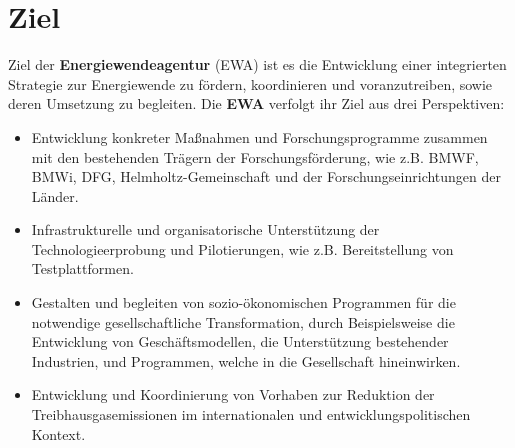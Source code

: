 \section{Ziel}

Ziel der \textbf{Energiewendeagentur} (EWA) ist es die Entwicklung einer integrierten Strategie zur Energiewende zu fördern, koordinieren und voranzutreiben, sowie deren Umsetzung zu begleiten.
%
Die \textbf{EWA} verfolgt ihr Ziel aus drei Perspektiven:
\begin{itemize}
	\item Entwicklung konkreter Maßnahmen und Forschungsprogramme zusammen mit den bestehenden Trägern der Forschungsförderung, wie z.B. BMWF, BMWi, DFG, Helmholtz-Gemeinschaft und der Forschungseinrichtungen der Länder.
	\item Infrastrukturelle und organisatorische Unterstützung der Technologieerprobung und Pilotierungen, wie z.B. Bereitstellung von Testplattformen.
	\item Gestalten und begleiten von sozio-ökonomischen Programmen für die notwendige gesellschaftliche Transformation, durch Beispielsweise die Entwicklung von Geschäftsmodellen, die Unterstützung bestehender Industrien, und Programmen, welche in die Gesellschaft hineinwirken.
	\item Entwicklung und Koordinierung von Vorhaben zur Reduktion der Treibhausgasemissionen im internationalen und entwicklungspolitischen Kontext.
\end{itemize}

